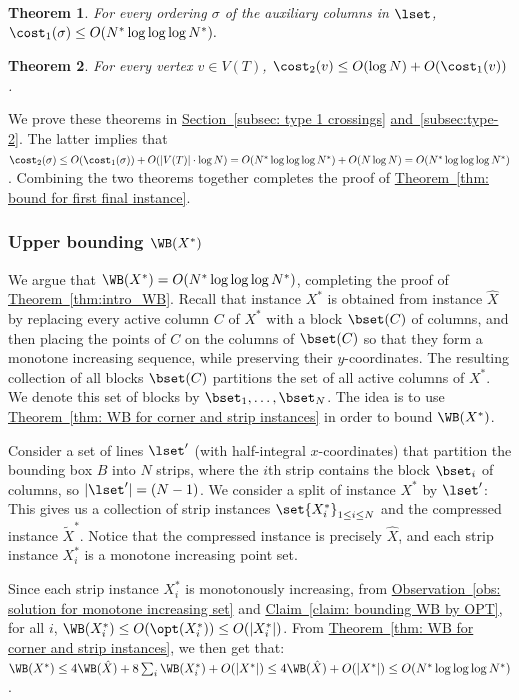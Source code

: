 \documentclass[11pt]{article}
\numberwithin{equation}{section}
\newtheorem{theorem}{Theorem}[section]
\theoremstyle{definition}
\theoremstyle{plain}
\newcommand{\expref}[2]{\hyperref[#2]{#1~\ref{#2}}}
\begin{document}
\begin{theorem}\label{thm: crossings inside instances}
	For every ordering $\sigma$ of the auxiliary columns in $\lset$, $\cost_1(\sigma)\leq O(N^*\log\log\log N^*).$
	\end{theorem}


\begin{theorem}\label{thm: bound cost 2}
	For every vertex $v\in V(T)$, $\cost_2(v)\leq O(\log N)+O(\cost_1(v))$.
\end{theorem}


We prove these theorems in  \expref{Section}{subsec: type 1 crossings} \expref{and}{subsec:type-2}. 
The latter implies that $\cost_2(\sigma)\leq O(\cost_1(\sigma))+O(|V(T)|\cdot \log N)=O(N^*\log\log\log N^*)+O(N\log N)=O(N^*\log\log\log N^*)$. Combining the two theorems together completes the proof of \expref{Theorem}{thm: bound for first final instance}.



%
%
%
%
%
%
%
\subsubsection{Upper bounding $\WB(X^*)$}

We argue that $\WB(X^*)=O(N^*\log\log\log N^*)$, completing the proof of \expref{Theorem}{thm:intro_WB}. 
Recall that instance $X^*$ is obtained from instance $\hat X$ by replacing every active column $C$ of $X^*$ with a block $\bset(C)$ of columns, and then placing the points of $C$ on the columns of $\bset(C)$ so that they form a monotone increasing sequence, while preserving their $y$-coordinates. 
The resulting collection of all blocks $\bset(C)$ partitions the set of all active columns of $X^*$. We denote this set of blocks by $\bset_1,\ldots,\bset_N$. 
The idea is to use \expref{Theorem}{thm: WB for corner and strip instances} in order to bound $\WB(X^*)$. 


Consider a set of lines $\lset'$ (with half-integral $x$-coordinates) that partition the bounding box $B$ into $N$ strips, where the $i$th strip contains the block $\bset_i$ of columns, so $|\lset'| = (N-1)$. 
We consider a split of instance $X^*$ by $\lset'$: This gives us  a collection of strip instances $\set{X^*_i}_{1\leq i\leq N}$ and the compressed instance $\widetilde{X}^*$. 
Notice that the compressed instance is precisely $\hat{X}$, and each strip instance $X^*_i$ is a monotone increasing point set.   


%
Since each strip instance $X^*_i$ is monotonously increasing, from \expref{Observation}{obs: solution for monotone increasing set} and \expref{Claim}{claim: bounding WB by OPT}, for all $i$, $\WB(X^*_i)\leq O(\opt(X^*_i))\leq O(|X^*_i|)$. From \expref{Theorem}{thm: WB for corner and strip instances}, we then get that:
$\WB(X^*)\leq 4\WB(\hat X)+8\sum_i\WB(X^*_i)+O(|X^*|)\leq 4\WB(\hat X)+O(|X^*|)\leq O(N^*\log\log\log N^*)$.
\end{document}
